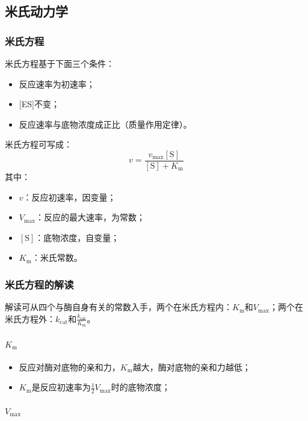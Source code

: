 \subsection{米氏动力学}

\subsubsection{米氏方程}

米氏方程基于下面三个条件：
\begin{itemize}
	\item 反应速率为初速率；
	\item \mbox{[ES]}不变；
	\item 反应速率与底物浓度成正比（质量作用定律）。
\end{itemize}

米氏方程可写成：
\[v=\frac{v_{\text{max}}[\text{S}]}{[\text{S}]+K_{\text{m}}}\]
其中：
\begin{itemize}
	\item $v$：反应初速率，因变量；
	\item $V_{\text{max}}$：反应的最大速率，为常数；
	\item $[\text{S}]$：底物浓度，自变量；
	\item $K_{\text{m}}$：米氏常数。
\end{itemize}

\subsubsection{米氏方程的解读}

解读可从四个与酶自身有关的常数入手，两个在米氏方程内：$K_{\text{m}}$和$V_{\text{max}}$；两个在米氏方程外：$k_{\text{cat}}$和$\displaystyle\frac{k_{\text{cat}}}{K_{\text{m}}}$。

\paragraph{$K_{\text{m}}$}

\begin{itemize}
	\item 反应对酶对底物的亲和力，$K_{\text{m}}$越大，酶对底物的亲和力越低；
	\item $K_{\text{m}}$是反应初速率为$\displaystyle\frac{1}{2} V_{\text{max}}$时的底物浓度；
\end{itemize}

\paragraph{$V_{\text{max}}$}

